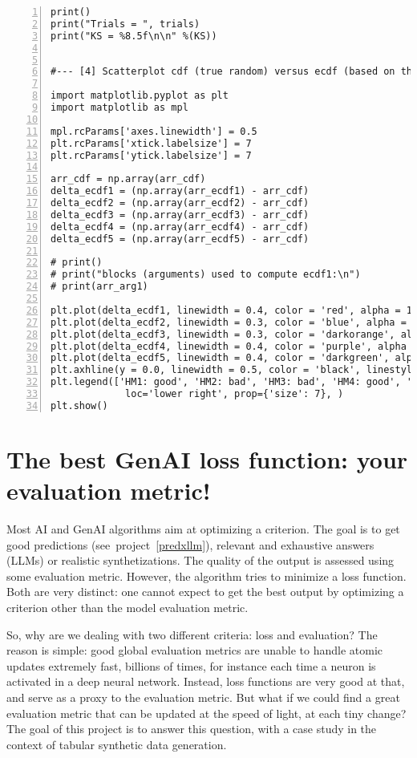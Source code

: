 \documentclass[oneside,10pt]{book}
\begin{document}
\begin{lstlisting}[numbers=left]
print()
print("Trials = ", trials)
print("KS = %8.5f\n\n" %(KS))


#--- [4] Scatterplot cdf (true random) versus ecdf (based on the two PRNGs) 

import matplotlib.pyplot as plt
import matplotlib as mpl

mpl.rcParams['axes.linewidth'] = 0.5
plt.rcParams['xtick.labelsize'] = 7
plt.rcParams['ytick.labelsize'] = 7

arr_cdf = np.array(arr_cdf) 
delta_ecdf1 = (np.array(arr_ecdf1) - arr_cdf) 
delta_ecdf2 = (np.array(arr_ecdf2) - arr_cdf) 
delta_ecdf3 = (np.array(arr_ecdf3) - arr_cdf) 
delta_ecdf4 = (np.array(arr_ecdf4) - arr_cdf) 
delta_ecdf5 = (np.array(arr_ecdf5) - arr_cdf) 

# print()
# print("blocks (arguments) used to compute ecdf1:\n")
# print(arr_arg1)

plt.plot(delta_ecdf1, linewidth = 0.4, color = 'red', alpha = 1)
plt.plot(delta_ecdf2, linewidth = 0.3, color = 'blue', alpha = 0.5)
plt.plot(delta_ecdf3, linewidth = 0.3, color = 'darkorange', alpha = 1)
plt.plot(delta_ecdf4, linewidth = 0.4, color = 'purple', alpha = 1)
plt.plot(delta_ecdf5, linewidth = 0.4, color = 'darkgreen', alpha = 1)
plt.axhline(y = 0.0, linewidth = 0.5, color = 'black', linestyle = 'dashed')
plt.legend(['HM1: good', 'HM2: bad', 'HM3: bad', 'HM4: good', 'Numpy'], 
             loc='lower right', prop={'size': 7}, )
plt.show()
\end{lstlisting}


\section{The best GenAI loss function: your evaluation metric!}

Most AI and GenAI algorithms aim at optimizing a criterion. The goal is to get good predictions (see~project~\ref{predxllm}), relevant 
 and exhaustive answers (LLMs) 
 or realistic synthetizations. The quality of the output is assessed using some 
\textcolor{index}{evaluation metric}. However, the algorithm tries to minimize a
 \textcolor{index}{loss function}. Both are very distinct: one cannot expect to get the best output by optimizing a criterion other than the model evaluation metric. 

So, why are we dealing with two different criteria: loss and evaluation? The reason is simple: good global evaluation metrics are
 unable to handle atomic updates extremely fast, billions of times, for instance each time a neuron is activated in a 
\textcolor{index}{deep neural network}. Instead, loss functions are very good at that, and serve as a proxy to the evaluation metric. But what if we could find a great
 evaluation metric that can be updated at the speed of light, at each tiny change? The goal of this project is to answer this question, with
 a case study in the context of tabular \textcolor{index}{synthetic data} generation.
\end{document}
